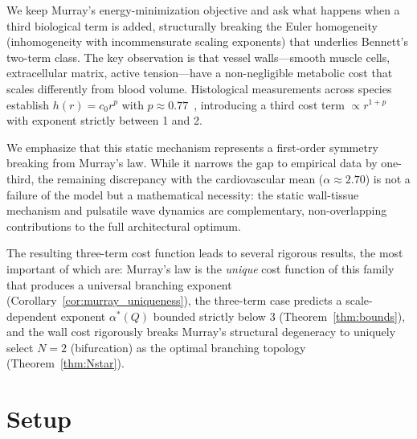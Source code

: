 \documentclass[11pt,a4paper]{article}
\theoremstyle{remark}
\begin{document}
We keep Murray's energy-minimization objective and ask what happens when
a third biological term is added, structurally breaking the Euler homogeneity
(inhomogeneity with incommensurate scaling exponents) that underlies Bennett's
two-term class. The key observation is that vessel walls---smooth muscle
cells, extracellular matrix, active tension---have a non-negligible metabolic
cost that scales differently from blood volume. Histological measurements
across species establish $h(r)=c_0 r^p$ with $p\approx0.77$~\cite{Rhodin1967,
Nichols2011,WolinskyGlagov1967}, introducing a third cost term $\propto r^{1+p}$
with exponent strictly between 1 and 2.

We emphasize that this static mechanism represents a first-order symmetry
breaking from Murray's law. While it narrows the gap to empirical data by
one-third, the remaining discrepancy with the cardiovascular mean
($\alpha \approx 2.70$) is not a failure of the model but a mathematical
necessity: the static wall-tissue mechanism and pulsatile wave dynamics are
complementary, non-overlapping contributions to the full architectural optimum.

The resulting three-term cost function leads to several rigorous results, the
most important of which are: Murray's law is the \emph{unique} cost function
of this family that produces a universal branching exponent
(Corollary~\ref{cor:murray_uniqueness}), the three-term case predicts a
scale-dependent exponent $\alpha^*(Q)$ bounded strictly below 3
(Theorem~\ref{thm:bounds}), and the wall cost rigorously breaks Murray's
structural degeneracy to uniquely select $N=2$ (bifurcation) as the optimal
branching topology (Theorem~\ref{thm:Nstar}).

\section{Setup}
\label{sec:setup}
\end{document}
